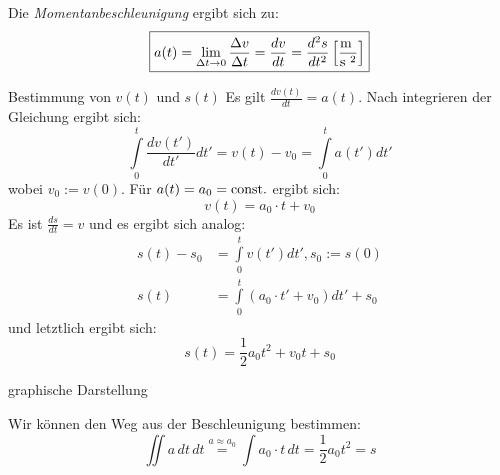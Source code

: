\documentclass[a4paper,10pt]{scrartcl}
\begin{document}
\begin{enumerate}[a)]
Die \emph{Momentanbeschleunigung} ergibt sich zu:
\[
\boxed{a(t)=\lim\limits_{\Delta t \rightarrow 0} \frac{\Delta v}{\Delta t}=\frac{dv}{dt}=\frac{d^2s}{dt^2}\left [\frac{\text{m }}{\text{s }^2}\right ]}
\]
\begin{seg}{Bestimmung von $v(t)$ und $s(t)$}
Es gilt $\frac{dv(t)}{dt}=a(t)$.  Nach integrieren der Gleichung ergibt sich:
\[
\int\limits_0^t \frac{dv(t')}{dt'}dt'=v(t)-v_0=\int\limits_0^t a(t')dt'
\]
wobei $v_0:=v(0)$.  Für $a(t)=a_0=\text{const.}$ ergibt sich:
\[
\boxed{v(t)=a_0\cdot t+v_0}
\]
Es ist $\frac{ds}{dt}=v$ und es ergibt sich analog:
\begin{align*}
s(t)-s_0&=\int\limits_0^t v(t')dt', s_0:= s(0)\\
s(t)    &=\int\limits_0^t (a_0\cdot t'+v_0)dt'+s_0
\end{align*}
und letztlich ergibt sich:
\[
\boxed{s(t)=\frac{1}{2}a_0t^2+v_0t+s_0}
\]
\end{seg}
\begin{seg}{graphische Darstellung}
\begin{figure}[h]
\end{figure}
Wir können den Weg aus der Beschleunigung bestimmen:
\[
\iint a \,dt\, dt\stackrel{a\approx a_0}{=}\int a_0\cdot t \,dt=\frac{1}{2}a_0t^2=s
\]
\end{seg}
\end{enumerate}
\end{document}
